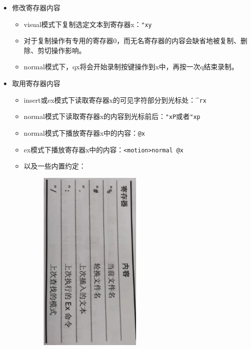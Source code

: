 \documentclass[fontset=windows]{ctexart}
\begin{document}
\begin{itemize}
	\item 修改寄存器内容
	\begin{itemize}
		\item visual模式下复制选定文本到寄存器x：\texttt{"xy}
		\item 对于复制操作有专用的寄存器0，而无名寄存器的内容会缺省地被复制、删除、剪切操作影响。
		\item normal模式下，qx将会开始录制按键操作到x中，再按一次q结束录制。
	\end{itemize}
	\item 取用寄存器内容
	\begin{itemize}
		\item insert或ex模式下读取寄存器x的可见字符部分到光标处：$\^$\texttt{rx}
		\item normal模式下读取寄存器x的内容到光标前后：\texttt{"xP}或者\texttt{"xp}
		\item normal模式下播放寄存器x中的内容：\texttt{@x}
		\item ex模式下播放寄存器x中的内容：\texttt{<motion>normal @x}
		\item 以及一些内置约定：
			\begin{figure}[h]
			\includegraphics[width=0.5\textwidth, angle=90]{some_regs}
			\end{figure}
	\end{itemize}
\end{itemize}
\end{document}
